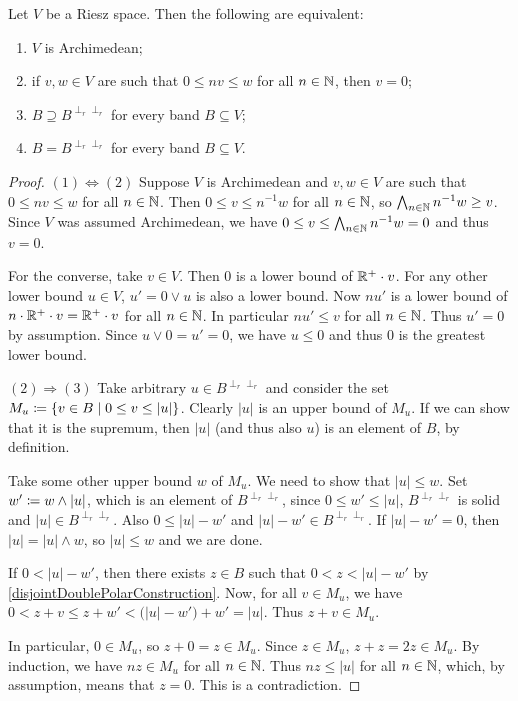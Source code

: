 \begin{proposition} \label{ArchimedeanBandEquivalents}
Let $V$ be a Riesz space. Then the following are equivalent:
\begin{enumerate}
\item $V$ is Archimedean;
\item if $v,w\in V$ are such that $0\leq nv\leq w$ for all $n\in \mathbb{N}$, then $v = 0$;
\item $B \supseteq B^{\perp_r\perp_r}$ for every band $B\subseteq V$;
\item $B = B^{\perp_r\perp_r}$ for every band $B\subseteq V$.
\end{enumerate}
\end{proposition}
\begin{proof}
$(1) \Leftrightarrow (2)$ Suppose $V$ is Archimedean and $v,w\in V$ are such that $0\leq nv\leq w$ for all $n\in \mathbb{N}$. Then $0\leq v\leq n^{-1}w$ for all $n\in \mathbb{N}$, so $\bigwedge_{n\in \mathbb{N}}n^{-1}w \geq v$. Since $V$ was assumed Archimedean, we have $0\leq v \leq \bigwedge_{n\in \mathbb{N}}n^{-1}w = 0$ and thus $v = 0$.

For the converse, take $v\in V$. Then $0$ is a lower bound of $\mathbb{R}^+\cdot v$. For any other lower bound $u\in V$, $u' = 0\vee u$ is also a lower bound. Now $nu'$ is a lower bound of $n\cdot \mathbb{R}^+\cdot v = \mathbb{R}^+\cdot v$ for all $n\in \mathbb{N}$. In particular $nu'\leq v$ for all $n\in \mathbb{N}$. Thus $u'=0$ by assumption. Since $u\vee 0 = u' = 0$, we have $u\leq 0$ and thus $0$ is the greatest lower bound.

$(2) \Rightarrow (3)$ Take arbitrary $u\in B^{\perp_r\perp_r}$ and consider the set $M_u \defeq \setbuilder{v\in B}{0\leq v \leq |u|}$. Clearly $|u|$ is an upper bound of $M_u$. If we can show that it is the supremum, then $|u|$ (and thus also $u$) is an element of $B$, by definition.

Take some other upper bound $w$ of $M_u$. We need to show that $|u|\leq w$. Set $w'\coloneqq w\wedge |u|$, which is an element of $B^{\perp_r\perp_r}$, since $0\leq w' \leq |u|$, $B^{\perp_r\perp_r}$ is solid and $|u|\in B^{\perp_r\perp_r}$. Also $0\leq |u| - w'$ and $|u|-w'\in B^{\perp_r\perp_r}$. If $|u|- w' = 0$, then $|u| = |u|\wedge w$, so $|u|\leq w$ and we are done.

If $0 < |u|- w'$, then there exists $z\in B$ such that $0< z < |u|-w'$ by \ref{disjointDoublePolarConstruction}. Now, for all $v\in M_u$, we have $0 < z+v \leq z+w' < \big(|u|-w'\big)+w' = |u|$. Thus $z+v\in M_u$.

In particular, $0\in M_u$, so $z+0 = z\in M_u$. Since $z\in M_u$, $z+z = 2z\in M_u$. By induction, we have $nz\in M_u$ for all $n\in\mathbb{N}$. Thus $nz\leq |u|$ for all $n\in \mathbb{N}$, which, by assumption, means that $z=0$. This is a contradiction.


\end{proof}
